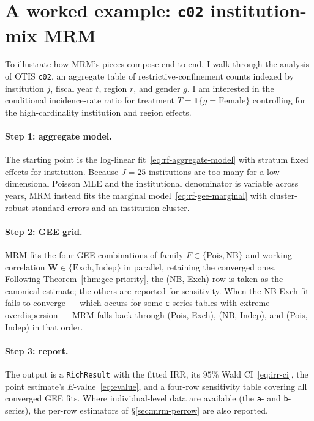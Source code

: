 \documentclass[11pt,a4paper]{article}
\theoremstyle{plain}
\theoremstyle{definition}
\theoremstyle{remark}
\newcommand{\one}{\mathbf{1}}
\begin{document}
\section{A worked example: \texttt{c02} institution-mix MRM}
\label{sec:worked-example}

To illustrate how MRM's pieces compose end-to-end, I walk
through the analysis of OTIS \texttt{c02}, an aggregate table of
restrictive-confinement counts indexed by institution $j$, fiscal
year $t$, region $r$, and gender $g$. I am interested in the
conditional incidence-rate ratio for treatment
$T = \one\{g = \text{Female}\}$ controlling for the
high-cardinality institution and region effects.

\paragraph{Step 1: aggregate model.} The starting point is the
log-linear fit~\eqref{eq:rf-aggregate-model} with stratum fixed
effects for institution. Because $J = 25$ institutions are too
many for a low-dimensional Poisson MLE and the institutional
denominator is variable across years, MRM instead fits the
marginal model~\eqref{eq:rf-gee-marginal} with cluster-robust
standard errors and an institution cluster.

\paragraph{Step 2: GEE grid.} MRM fits the four GEE
combinations of family $F \in \{\text{Pois}, \text{NB}\}$ and
working correlation $\mathbf{W} \in \{\text{Exch}, \text{Indep}\}$
in parallel, retaining the converged ones. Following
Theorem~\ref{thm:gee-priority}, the (NB, Exch) row is taken as the
canonical estimate; the others are reported for sensitivity. When
the NB-Exch fit fails to converge --- which occurs for some
\texttt{c}-series tables with extreme overdispersion --- MRM
falls back through (Pois, Exch), (NB, Indep), and (Pois, Indep)
in that order.

\paragraph{Step 3: report.} The output is a \texttt{RichResult}
with the fitted IRR, its $95\%$ Wald CI~\eqref{eq:irr-ci}, the
point estimate's $E$-value~\eqref{eq:evalue}, and a four-row
sensitivity table covering all converged GEE fits. Where
individual-level data are available (the \texttt{a}- and
\texttt{b}-series), the per-row estimators of
\S\ref{sec:mrm-perrow} are also reported.
\end{document}
